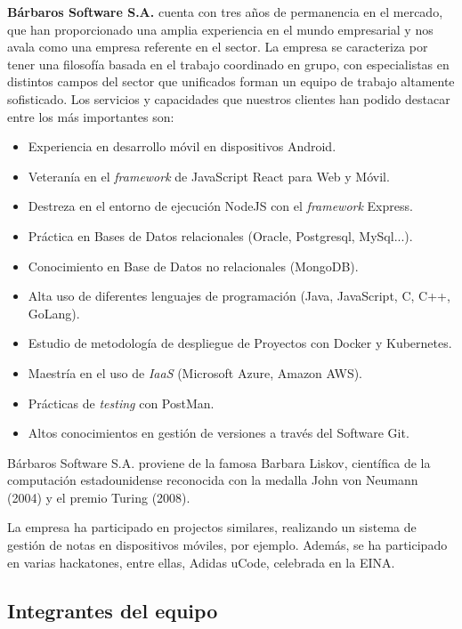 \documentclass{article}
\begin{document}
\textbf{Bárbaros Software S.A.} cuenta con tres años de permanencia en el mercado, que han proporcionado una amplia experiencia en el mundo empresarial y nos avala como una empresa referente en el sector. La empresa se caracteriza por tener una filosofía basada en el trabajo coordinado en grupo, con especialistas en distintos campos del sector que unificados forman un equipo de trabajo altamente sofisticado.
Los servicios y capacidades que nuestros clientes han podido destacar entre los más importantes son:
\begin{itemize}
    \setlength\itemsep{0em}
    \item Experiencia en desarrollo móvil en dispositivos Android.
    \item Veteranía en el \textit{framework} de JavaScript React para Web y Móvil.
    \item Destreza en el entorno de ejecución NodeJS con el \textit{framework} Express.
    \item Práctica en Bases de Datos relacionales (Oracle, Postgresql, MySql...).
    \item Conocimiento en Base de Datos no relacionales (MongoDB).
    \item Alta uso de diferentes lenguajes de programación (Java, JavaScript, C, C++, GoLang).
    \item Estudio de metodología de despliegue de Proyectos con Docker y Kubernetes.
    \item Maestría en el uso de \textit{IaaS} (Microsoft Azure, Amazon AWS).
    \item Prácticas de \textit{testing} con PostMan.
    \item Altos conocimientos en gestión de versiones a través del Software Git.
\end{itemize}

Bárbaros Software S.A. proviene de la famosa Barbara Liskov, científica de la computación estadounidense reconocida con la medalla John von Neumann (2004) y el premio Turing (2008).

La empresa ha participado en projectos similares, realizando un sistema de gestión de notas en dispositivos móviles, por ejemplo. Además, se ha participado en varias hackatones, entre ellas, Adidas uCode, celebrada en la EINA. 


\pagebreak

\subsection*{Integrantes del equipo}
\end{document}
